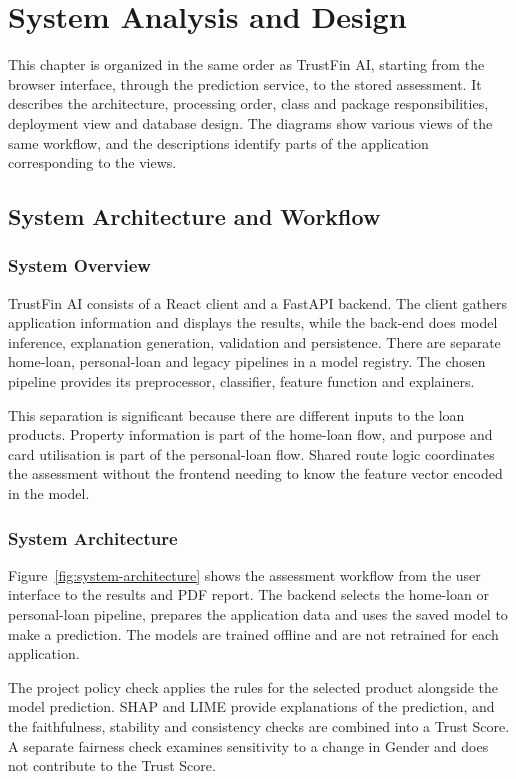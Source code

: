 \chapter[SYSTEM ANALYSIS AND DESIGN]{System Analysis and Design}

This chapter is organized in the same order as TrustFin AI, starting from the browser interface, through the prediction service, to the stored assessment. It describes the architecture, processing order, class and package responsibilities, deployment view and database design. The diagrams show various views of the same workflow, and the descriptions identify parts of the application corresponding to the views.

\section{System Architecture and Workflow}
\subsection{System Overview}
TrustFin AI consists of a React client and a FastAPI backend. The client gathers application information and displays the results, while the back-end does model inference, explanation generation, validation and persistence. There are separate home-loan, personal-loan and legacy pipelines in a model registry. The chosen pipeline provides its preprocessor, classifier, feature function and explainers.

This separation is significant because there are different inputs to the loan products. Property information is part of the home-loan flow, and purpose and card utilisation is part of the personal-loan flow. Shared route logic coordinates the assessment without the frontend needing to know the feature vector encoded in the model.

\subsection{System Architecture}
Figure~\ref{fig:system-architecture} shows the assessment workflow from the user interface to the results and PDF report. The backend selects the home-loan or personal-loan pipeline, prepares the application data and uses the saved model to make a prediction. The models are trained offline and are not retrained for each application.

The project policy check applies the rules for the selected product alongside the model prediction. SHAP and LIME provide explanations of the prediction, and the faithfulness, stability and consistency checks are combined into a Trust Score. A separate fairness check examines sensitivity to a change in Gender and does not contribute to the Trust Score.

